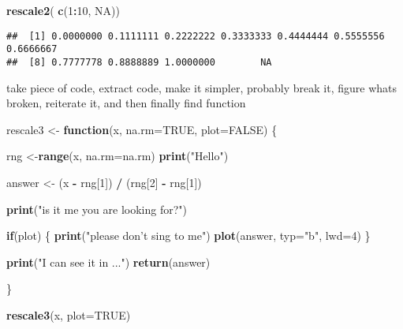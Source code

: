\documentclass[]{article}
\newenvironment{Shaded}{\begin{snugshade}}{\end{snugshade}}
\newcommand{\ControlFlowTok}[1]{\textcolor[rgb]{0.13,0.29,0.53}{\textbf{#1}}}
\newcommand{\DataTypeTok}[1]{\textcolor[rgb]{0.13,0.29,0.53}{#1}}
\newcommand{\DecValTok}[1]{\textcolor[rgb]{0.00,0.00,0.81}{#1}}
\newcommand{\KeywordTok}[1]{\textcolor[rgb]{0.13,0.29,0.53}{\textbf{#1}}}
\newcommand{\NormalTok}[1]{#1}
\newcommand{\OperatorTok}[1]{\textcolor[rgb]{0.81,0.36,0.00}{\textbf{#1}}}
\newcommand{\OtherTok}[1]{\textcolor[rgb]{0.56,0.35,0.01}{#1}}
\newcommand{\StringTok}[1]{\textcolor[rgb]{0.31,0.60,0.02}{#1}}
\begin{document}
\begin{Shaded}
\begin{Highlighting}[]
\KeywordTok{rescale2}\NormalTok{( }\KeywordTok{c}\NormalTok{(}\DecValTok{1}\OperatorTok{:}\DecValTok{10}\NormalTok{, }\OtherTok{NA}\NormalTok{))}
\end{Highlighting}
\end{Shaded}

\begin{verbatim}
##  [1] 0.0000000 0.1111111 0.2222222 0.3333333 0.4444444 0.5555556 0.6666667
##  [8] 0.7777778 0.8888889 1.0000000        NA
\end{verbatim}

take piece of code, extract code, make it simpler, probably break it,
figure whats broken, reiterate it, and then finally find function

\begin{Shaded}
\begin{Highlighting}[]
\NormalTok{rescale3 <-}\StringTok{ }\ControlFlowTok{function}\NormalTok{(x, }\DataTypeTok{na.rm=}\OtherTok{TRUE}\NormalTok{, }\DataTypeTok{plot=}\OtherTok{FALSE}\NormalTok{) \{}
  
\NormalTok{ rng <-}\KeywordTok{range}\NormalTok{(x, }\DataTypeTok{na.rm=}\NormalTok{na.rm)}
 \KeywordTok{print}\NormalTok{(}\StringTok{"Hello"}\NormalTok{)}
 
\NormalTok{ answer <-}\StringTok{ }\NormalTok{(x }\OperatorTok{-}\StringTok{ }\NormalTok{rng[}\DecValTok{1}\NormalTok{]) }\OperatorTok{/}\StringTok{ }\NormalTok{(rng[}\DecValTok{2}\NormalTok{] }\OperatorTok{-}\StringTok{ }\NormalTok{rng[}\DecValTok{1}\NormalTok{])}
 
 \KeywordTok{print}\NormalTok{(}\StringTok{"is it me you are looking for?"}\NormalTok{)}
 
 \ControlFlowTok{if}\NormalTok{(plot) \{}
   \KeywordTok{print}\NormalTok{(}\StringTok{"please don't sing to me"}\NormalTok{)}
 \KeywordTok{plot}\NormalTok{(answer, }\DataTypeTok{typ=}\StringTok{"b"}\NormalTok{, }\DataTypeTok{lwd=}\DecValTok{4}\NormalTok{)}
\NormalTok{ \}}
 
 \KeywordTok{print}\NormalTok{(}\StringTok{"I can see it in ..."}\NormalTok{)}
 \KeywordTok{return}\NormalTok{(answer)}
 
\NormalTok{\}}
\end{Highlighting}
\end{Shaded}

\begin{Shaded}
\begin{Highlighting}[]
\KeywordTok{rescale3}\NormalTok{(x, }\DataTypeTok{plot=}\OtherTok{TRUE}\NormalTok{)}
\end{Highlighting}
\end{Shaded}
\end{document}
